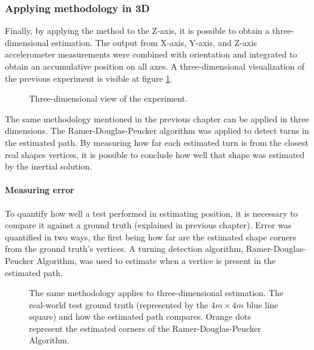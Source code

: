 \newpage

\subsubsection{Applying methodology in 3D}

Finally, by applying the method to the Z-axis, it is possible to obtain a  three-dimensional estimation. The output from X-axis, Y-axis, and Z-axis accelerometer measurements were combined with orientation and integrated to obtain an accumulative position on all axes.
A three-dimensional visualization of the previous experiment is visible at figure \ref{fig:square3D}.

\begin{figure}[!h]
    \centering
    \resizebox{0.8\linewidth}{!}{}
    \caption{Three-dimensional view of the experiment.}
    \label{fig:square3D}
\end{figure}

The same methodology mentioned in the previous chapter can be applied in three dimensions. The Ramer-Douglas-Peucker algorithm was applied to detect turns in the estimated path. By measuring how far each estimated turn is from the closest real shapes vertices, it is possible to conclude how well that shape was estimated by the inertial solution.

\paragraph{Measuring error}


To quantify how well a test performed in estimating position, it is necessary to compare it against a ground truth (explained in previous chapter). Error was quantified in two ways, the first being how far are the estimated shape corners from the ground truth's vertices. A turning detection algorithm, Ramer-Douglas-Peucker Algorithm, was used to estimate when a vertice is present in the estimated path.


\begin{figure}[!h]
    \centering
    \resizebox{0.8\linewidth}{!}{}
    \caption{The same methodology applies to three-dimensional estimation. The real-world test ground truth (represented by the $4m\times 4m$ blue line square) and how the estimated path compares. Orange dots represent the estimated corners of the Ramer-Douglas-Peucker Algorithm.}
    \label{fig:square3D_truth}
\end{figure}

